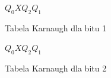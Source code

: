 \documentclass[12pt,a4paper,openright,dvipsnames]{mwrep}
\begin{document}
\begin{figure}[H]
    \centering
    \begin{Karnaugh}{$Q_0 X$}{$Q_2 Q_1$}
    \end{Karnaugh}
    \caption{Tabela Karnaugh dla bitu 1}
\end{figure}

\begin{figure}[H]
    \centering
    \begin{Karnaugh}{$Q_0 X$}{$Q_2 Q_1$}
    \end{Karnaugh}
    \caption{Tabela Karnaugh dla bitu 2}
\end{figure}
\end{document}
